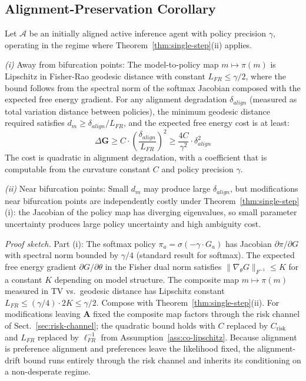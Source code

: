 \documentclass[runningheads]{llncs}
\begin{document}
\subsection{Alignment-Preservation Corollary}
\begin{corollary}
\label{cor:alignment}
Let $\mathcal{A}$ be an initially aligned active inference agent with policy precision $\gamma$, operating in the regime where Theorem~\ref{thm:single-step}(ii) applies.

\emph{(i)} Away from bifurcation points: The model-to-policy map $m \mapsto \pi(m)$ is Lipschitz in Fisher-Rao geodesic distance with constant $L_{FR} \leq \gamma/2$, where the bound follows from the spectral norm of the softmax Jacobian composed with the expected free energy gradient. For any alignment degradation $\delta_{align}$ (measured as total variation distance between policies), the minimum geodesic distance required satisfies $d_m \geq \delta_{align}/L_{FR}$, and the expected free energy cost is at least:
\begin{equation}
\Delta \mathbf{G} \geq C \cdot \left(\frac{\delta_{align}}{L_{FR}}\right)^2 \geq \frac{4C}{\gamma^2} \cdot \delta_{align}^2
\end{equation}
The cost is quadratic in alignment degradation, with a coefficient that is computable from the curvature constant $C$ and policy precision $\gamma$.

\emph{(ii)} Near bifurcation points: Small $d_m$ may produce large $\delta_{align}$, but modifications near bifurcation points are independently costly under Theorem~\ref{thm:single-step}(i): the Jacobian of the policy map has diverging eigenvalues, so small parameter uncertainty produces large policy uncertainty and high ambiguity cost.
\end{corollary}

\emph{Proof sketch.} Part (i): The softmax policy $\pi_a = \sigma(-\gamma \cdot G_a)$ has Jacobian $\partial\pi/\partial G$ with spectral norm bounded by $\gamma/4$ (standard result for softmax). The expected free energy gradient $\partial G / \partial\theta$ in the Fisher dual norm satisfies $\|\nabla_\theta G\|_{F^{-1}} \leq K$ for a constant $K$ depending on model structure. The composite map $m \mapsto \pi(m)$ measured in TV vs.\ geodesic distance has Lipschitz constant $L_{FR} \leq (\gamma/4) \cdot 2K \leq \gamma/2$. Compose with Theorem~\ref{thm:single-step}(ii). For modifications leaving $\mathbf{A}$ fixed the composite map factors through the risk channel of Sect.~\ref{sec:risk-channel}; the quadratic bound holds with $C$ replaced by $C_{\text{risk}}$ and $L_{FR}$ replaced by $\ell_{FR}^{-1}$ from Assumption~\ref{ass:co-lipschitz}. Because alignment is preference alignment and preferences leave the likelihood fixed, the alignment-drift bound runs entirely through the risk channel and inherits its conditioning on a non-desperate regime.
\end{document}
